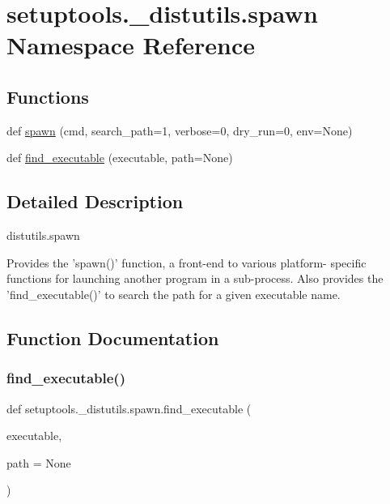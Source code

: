 \hypertarget{namespacesetuptools_1_1__distutils_1_1spawn}{}\section{setuptools.\+\_\+distutils.\+spawn Namespace Reference}
\label{namespacesetuptools_1_1__distutils_1_1spawn}
\subsection*{Functions}
\begin{DoxyCompactItemize}
\item 
def \hyperlink{namespacesetuptools_1_1__distutils_1_1spawn_a166195c57c6f48f22abaca8c8d386f43}{spawn} (cmd, search\+\_\+path=1, verbose=0, dry\+\_\+run=0, env=None)
\item 
def \hyperlink{namespacesetuptools_1_1__distutils_1_1spawn_ab0bcca76cc491d34a62871cd0d80e3c8}{find\+\_\+executable} (executable, path=None)
\end{DoxyCompactItemize}


\subsection{Detailed Description}
\begin{DoxyVerb}distutils.spawn

Provides the 'spawn()' function, a front-end to various platform-
specific functions for launching another program in a sub-process.
Also provides the 'find_executable()' to search the path for a given
executable name.
\end{DoxyVerb}
 

\subsection{Function Documentation}
\mbox{\label{namespacesetuptools_1_1__distutils_1_1spawn_ab0bcca76cc491d34a62871cd0d80e3c8}} 
\subsubsection{\texorpdfstring{find\+\_\+executable()}{find\_executable()}}
{\footnotesize\ttfamily def setuptools.\+\_\+distutils.\+spawn.\+find\+\_\+executable (\begin{DoxyParamCaption}\item[{}]{executable,  }\item[{}]{path = {\ttfamily None} }\end{DoxyParamCaption})}

